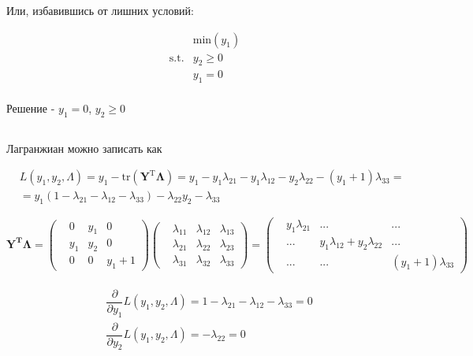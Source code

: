 	Или, избавившись от лишних условий:
	
	\begin{equation}
	\begin{split}
	&\text{min} (y_1)\\
	\text{s.t.}&y_2 \geqslant 0\\
	&y_1 = 0\\
	\end{split}
	\end{equation}
	
	Решение - $y_1 = 0$, $y_2 \geqslant 0$
	
	\subsection{}
		
	Лагранжиан можно записать как
	
	\begin{equation}
	\begin{split}
	&L(y_1,y_2, \Lambda) = y_1 - \text{tr}(\mathbf{Y}^{\text{T}}\mathbf{\Lambda}) = y_1 -  y_1\lambda_{21} - y_1\lambda_{12} - y_2\lambda_{22} - (y_1+1)\lambda_{33} =\\
	 & = y_1 (1 -  \lambda_{21} - \lambda_{12} - \lambda_{33} )- \lambda_{22} y_2 - \lambda_{33} 
	\end{split}
	\end{equation}
	
	$\mathbf{\mathbf{Y}^{\text{T}}\mathbf{\Lambda}} =\left( \begin{matrix}
	 & 0 & y_1 & 0 \\
	 & y_1 & y_2 & 0 \\
	 & 0 & 0 & y_1 +1 
	\end{matrix}\right) 
	\left( \begin{matrix}
	& \lambda_{11} & \lambda_{12} & \lambda_{13} \\
	& \lambda_{21} & \lambda_{22} & \lambda_{23} \\
	& \lambda_{31} & \lambda_{32} & \lambda_{33} 
	\end{matrix}\right) = 	
	\left( \begin{matrix}
	& y_1\lambda_{21} & ... & ... \\
	& ... & y_1\lambda_{12}+y_2\lambda_{22} & ... \\
	& ... & ... & (y_1+1)\lambda_{33} 
	\end{matrix}\right)  $
	
	\begin{align}
	\begin{aligned}
	&\dfrac{\partial}{\partial y_1} L(y_1,y_2, \Lambda) =  1 -  \lambda_{21} - \lambda_{12} - \lambda_{33} = 0 \\
	&\dfrac{\partial}{\partial y_2} L(y_1,y_2, \Lambda) = - \lambda_{22} = 0 
	\end{aligned}
	\end{align}
	
